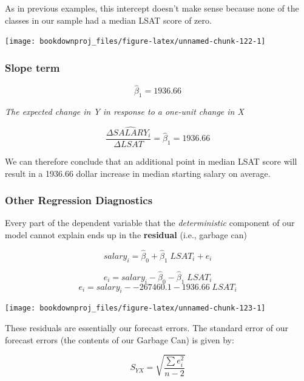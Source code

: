\documentclass[
]{book}
\newenvironment{Shaded}{\begin{snugshade}}{\end{snugshade}}
\newcommand{\FunctionTok}[1]{\textcolor[rgb]{0.13,0.29,0.53}{\textbf{#1}}}
\newcommand{\NormalTok}[1]{#1}
\newcommand{\SpecialCharTok}[1]{\textcolor[rgb]{0.81,0.36,0.00}{\textbf{#1}}}
\begin{document}
As in previous examples, this intercept doesn't make sense because none of the classes in our sample had a median LSAT score of zero.

\begin{center}\texttt{[image: bookdownproj\_files/figure-latex/unnamed-chunk-122-1]} \end{center}

\subsubsection*{Slope term}\label{slope-term}

\[\hat\beta_1 = 1936.66\]

\medskip

\emph{The expected change in Y in response to a one-unit change in X}

\[\frac{\Delta\widehat{SALARY}_i}{\Delta LSAT} = \hat\beta_1 = 1936.66\]

We can therefore conclude that an additional point in median LSAT score will result in a 1936.66 dollar increase in median starting salary on average.

\subsubsection*{Other Regression Diagnostics}\label{other-regression-diagnostics}

Every part of the dependent variable that the \emph{deterministic} component of our model cannot explain ends up in the \textbf{residual} (i.e., garbage can)

\[salary_i = \hat\beta_0 + \hat\beta_1 \; LSAT_i + e_i\]

\[e_i = salary_i - \hat\beta_0 - \hat\beta_1 \; LSAT_i\]
\[e_i = salary_i - -267460.1 - 1936.66 \; LSAT_i\]

\begin{center}\texttt{[image: bookdownproj\_files/figure-latex/unnamed-chunk-123-1]} \end{center}

These residuals are essentially our forecast errors. The standard error of our forecast errors (the contents of our Garbage Can) is given by:

\[S_{YX} = \sqrt{ \frac{\sum e^2_i}{n-2}}\]

\begin{Shaded}
\end{Shaded}
\end{document}

